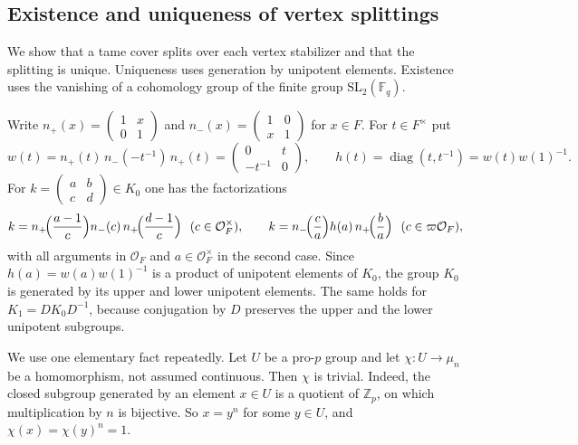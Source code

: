 \documentclass[12pt,letterpaper]{article}
\numberwithin{equation}{section}
\theoremstyle{definition}
\theoremstyle{remark}
\newcommand{\OO}{\mathcal O_F}
\newcommand{\kk}{\mathbb F_q}
\newcommand{\diag}{\operatorname{diag}}
\newcommand{\np}{n_{+}}
\newcommand{\nm}{n_{-}}
\newcommand{\sm}[4]{\left(\begin{smallmatrix}#1&#2\\#3&#4\end{smallmatrix}\right)}
\begin{document}
\subsection*{Existence and uniqueness of vertex splittings}
We show that a tame cover splits over each vertex stabilizer and that the splitting is unique. Uniqueness uses generation by unipotent elements. Existence uses the vanishing of a cohomology group of the finite group $\mathrm{SL}_2(\kk)$.

Write $\np(x)=\sm1x01$ and $\nm(x)=\sm10x1$ for $x\in F$. For $t\in F^\times$ put
\[
 w(t)=\np(t)\,\nm(-t^{-1})\,\np(t)=\sm{0}{t}{-t^{-1}}{0},
 \qquad h(t)=\diag(t,t^{-1})=w(t)w(1)^{-1}.
\]
For $k=\sm abcd\in K_0$ one has the factorizations
\begin{equation}\label{eq:word}
 k=\np\!\Bigl(\frac{a-1}{c}\Bigr)\nm(c)\,\np\!\Bigl(\frac{d-1}{c}\Bigr)\ \ (c\in\OO^\times),
 \qquad
 k=\nm\!\Bigl(\frac ca\Bigr)h(a)\,\np\!\Bigl(\frac ba\Bigr)\ \ (c\in\varpi\OO),
\end{equation}
with all arguments in $\OO$ and $a\in\OO^\times$ in the second case. Since $h(a)=w(a)w(1)^{-1}$ is a product of unipotent elements of $K_0$, the group $K_0$ is generated by its upper and lower unipotent elements. The same holds for $K_1=DK_0D^{-1}$, because conjugation by $D$ preserves the upper and the lower unipotent subgroups.

We use one elementary fact repeatedly. Let $U$ be a pro-$p$ group and let $\chi:U\to\mu_n$ be a homomorphism, not assumed continuous. Then $\chi$ is trivial. Indeed, the closed subgroup generated by an element $x\in U$ is a quotient of $\mathbb Z_p$, on which multiplication by $n$ is bijective. So $x=y^n$ for some $y\in U$, and $\chi(x)=\chi(y)^n=1$.
\end{document}
